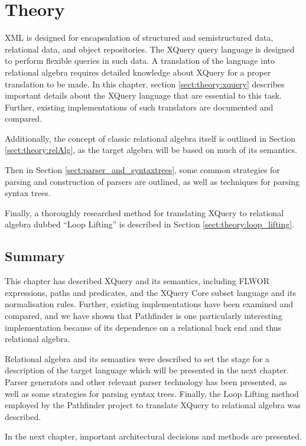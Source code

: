 \chapter{Theory}
\label{chapter:theory}
XML is designed for encapsulation of structured and semistructured data,
relational data, and object repositories. The XQuery query language is designed
to perform flexible queries in such data. A translation of the language into
relational algebra requires detailed knowledge about XQuery for a proper translation to be made. In this chapter, section
\ref{sect:theory:xquery} describes important details about the XQuery
language that are essential to this task. Further, existing implementations of
such translators are documented and compared.

Additionally, the concept of classic relational algebra itself is outlined in
Section \ref{sect:theory:relAlg}, as the target algebra will be based on much
of its semantics.

Then in Section \ref{sect:parser_and_syntaxtrees}, some common strategies for
parsing and construction of parsers are outlined, as well as techniques for
parsing syntax trees.

Finally, a thoroughly researched method for translating XQuery to relational
algebra dubbed ``Loop Lifting'' is described in Section \ref{sect:theory:loop_lifting}.







\section{Summary}
\label{sect:theory:summary}
This chapter has described XQuery and its semantics, including FLWOR
expressions, paths and predicates, and the XQuery Core subset language and its
normalisation rules. Further, existing implementations have been examined and
compared, and we have shown that Pathfinder is one particularly interesting
implementation because of its dependence on a relational back end and thus
relational algebra.

Relational algebra and its semantics were described to set the stage for a
description of the target language which will be presented in the next chapter.
Parser generators and other relevant parser technology has been presented, as
well as some strategies for parsing syntax trees. Finally, the Loop Lifting
method employed by the Pathfinder project to translate XQuery to relational
algebra was described.

In the next chapter, important architectural decisions and methods are
presented.